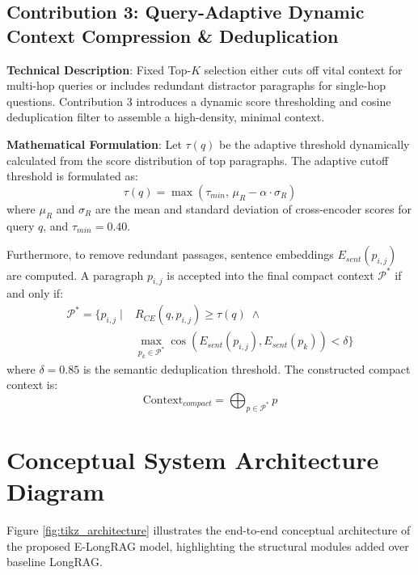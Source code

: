 \documentclass[11pt,a4paper]{article}
\begin{document}
\subsection{Contribution 3: Query-Adaptive Dynamic Context Compression \& Deduplication}
\textbf{Technical Description}: Fixed Top-$K$ selection either cuts off vital context for multi-hop queries or includes redundant distractor paragraphs for single-hop questions. Contribution 3 introduces a dynamic score thresholding and cosine deduplication filter to assemble a high-density, minimal context.

\textbf{Mathematical Formulation}:
Let $\tau(q)$ be the adaptive threshold dynamically calculated from the score distribution of top paragraphs. The adaptive cutoff threshold is formulated as:
\begin{equation}
    \tau(q) = \max \left( \tau_{min}, \, \mu_R - \alpha \cdot \sigma_R \right)
\end{equation}
where $\mu_R$ and $\sigma_R$ are the mean and standard deviation of cross-encoder scores for query $q$, and $\tau_{min} = 0.40$.

Furthermore, to remove redundant passages, sentence embeddings $E_{sent}(p_{i,j})$ are computed. A paragraph $p_{i,j}$ is accepted into the final compact context $\mathcal{P}^*$ if and only if:
\begin{equation}
\begin{aligned}
    \mathcal{P}^* = \Big\{ p_{i,j} \;\Big|\;& R_{CE}(q, p_{i,j}) \ge \tau(q) \;\land\; \\
    & \max_{p_k \in \mathcal{P}^*} \cos\left(E_{sent}(p_{i,j}), E_{sent}(p_k)\right) < \delta \Big\}
\end{aligned}
\end{equation}
where $\delta = 0.85$ is the semantic deduplication threshold. The constructed compact context is:
\begin{equation}
    \text{Context}_{compact} = \bigoplus_{p \in \mathcal{P}^*} p
\end{equation}

\section{Conceptual System Architecture Diagram}

Figure \ref{fig:tikz_architecture} illustrates the end-to-end conceptual architecture of the proposed E-LongRAG model, highlighting the structural modules added over baseline LongRAG.
\end{document}
